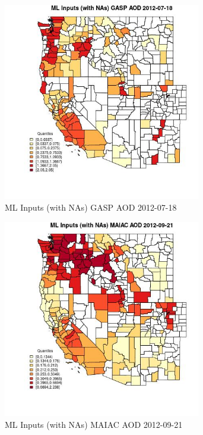 \begin{figure} 
\centering  
\includegraphics[width=0.77\textwidth]{Code_Outputs/Report_ML_input_PM25_Step4_part_e_de_duplicated_aves_compiled_2019-05-14wNAs_CountyGASP_AODMean2012-07-18_2012-07-18.jpg} 
\caption{\label{fig:Report_ML_input_PM25_Step4_part_e_de_duplicated_aves_compiled_2019-05-14wNAsCountyGASP_AODMean2012-07-18_2012-07-18}ML Inputs (with NAs) GASP AOD 2012-07-18} 
\end{figure} 
 

\clearpage 

\begin{figure} 
\centering  
\includegraphics[width=0.77\textwidth]{Code_Outputs/Report_ML_input_PM25_Step4_part_e_de_duplicated_aves_compiled_2019-05-14wNAs_CountyMAIAC_AODMean2012-09-21_2012-09-21.jpg} 
\caption{\label{fig:Report_ML_input_PM25_Step4_part_e_de_duplicated_aves_compiled_2019-05-14wNAsCountyMAIAC_AODMean2012-09-21_2012-09-21}ML Inputs (with NAs) MAIAC AOD 2012-09-21} 
\end{figure} 
 

